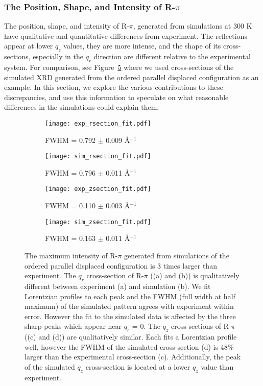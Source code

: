   \subsubsection{The Position, Shape, and Intensity of R-$\pi$}\label{section:rpi}

  The position, shape, and intensity of R-$\pi$, generated from simulations at
  300 K have qualitative and quantitative differences from experiment. The
  reflections appear at lower $q_z$ values, they are more intense, and the shape
  of its cross-sections, especially in the $q_r$ direction are different relative
  to the experimental system. For comparison, see
  Figure~\ref{fig:rpi_exp_comparison} where we used cross-sections of the
  simulated XRD generated from the ordered parallel displaced configuration as an
  example. In this section, we explore the various contributions to these
  discrepancies, and use this information to speculate on what reasonable
  differences in the simulations could explain them.
  
  \begin{figure}
  \centering
  \begin{subfigure}{0.45\textwidth}
  \texttt{[image: exp\_rsection\_fit.pdf]}
  \caption{FWHM = 0.792 $\pm$ 0.009 \AA$^{-1}$}\label{fig:exp_rsection_fit}
  \end{subfigure}
  \begin{subfigure}{0.45\textwidth}
  \texttt{[image: sim\_rsection\_fit.pdf]}
  \caption{FWHM = 0.796 $\pm$ 0.011 \AA$^{-1}$}\label{fig:sim_rsection_fit}
  \end{subfigure}
  \begin{subfigure}{0.45\textwidth}
  \texttt{[image: exp\_zsection\_fit.pdf]}
  \caption{FWHM = 0.110 $\pm$ 0.003 \AA$^{-1}$}\label{fig:exp_zsection_fit}
  \end{subfigure}
  \begin{subfigure}{0.45\textwidth}
  \texttt{[image: sim\_zsection\_fit.pdf]}
  \caption{FWHM = 0.163 $\pm$ 0.011 \AA$^{-1}$}\label{fig:sim_zsection_fit}
  \end{subfigure}
  \caption{
	  The maximum intensity of R-$\pi$ generated from simulations of the ordered
	  parallel displaced configuration is 3 times larger than experiment. The $q_r$
	  cross-section of R-$\pi$ ((a) and (b)) is qualitatively different between
	  experiment (a) and simulation (b). We fit Lorentzian profiles to each peak and
	  the FWHM (full width at half maximum) of the simulated pattern agrees with
	  experiment within error. However the fit to the simulated data is affected by
	  the three sharp peaks which appear near $q_r$ = 0. The $q_z$ cross-sections of
	  R-$\pi$ ((c) and (d)) are qualitatively similar. Each fits a Lorentzian profile
	  well, however the FWHM of the simulated cross-section (d) is 48\% larger than
	  the experimental cross-section (c). Additionally, the peak of the simulated
	  $q_z$ cross-section is located at a lower $q_z$ value than
	  experiment.}\label{fig:rpi_exp_comparison}
  \end{figure}

